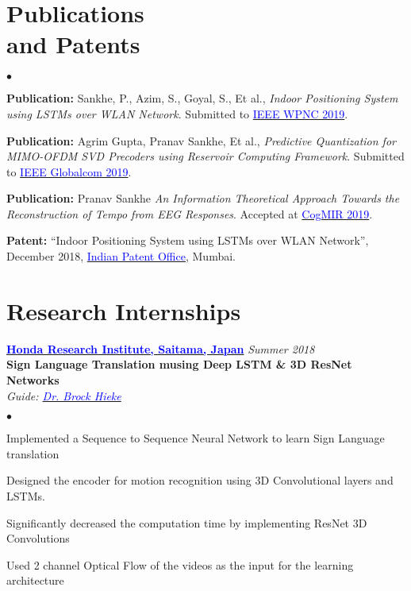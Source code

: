 \documentclass[margin,line]{res}
\newenvironment{list2}{
  \begin{list}{$\bullet$}{%
      \setlength{\itemsep}{0.03in}
      \setlength{\parsep}{0in} \setlength{\parskip}{0in}
      \setlength{\topsep}{0in} \setlength{\partopsep}{0in} 
      \setlength{\leftmargin}{0.2in}}}{\end{list}}
\begin{document}
\begin{resume}
\section{\sc Publications \\ and Patents}
\begin{list2}
\item \textbf{Publication:} Sankhe, P., Azim, S., Goyal, S., Et al., {\em Indoor Positioning System using LSTMs over WLAN Network}. Submitted to \href{https://wpnc.info}{\textcolor{blue}{IEEE WPNC 2019}}.

\item \textbf{Publication:} Agrim Gupta, Pranav Sankhe, Et al., {\em Predictive Quantization for MIMO-OFDM SVD Precoders using Reservoir Computing Framework}. Submitted to \href{https://globecom2019.ieee-globecom.org}{\textcolor{blue} {IEEE Globalcom 2019}}.

\item \textbf{Publication:} Pranav Sankhe {\em An Information Theoretical Approach Towards the Reconstruction of Tempo from EEG Responses}. Accepted at \href{http://www.cogmir.org}{\textcolor{blue} {CogMIR 2019}}.

\item \textbf{Patent:} “Indoor Positioning System using LSTMs over WLAN Network”, December 2018, \href{http://www.ipindia.nic.in}{\textcolor{blue} {Indian Patent Office}}, Mumbai.


\end{list2}

\section{\sc Research Internships}

{\bf  \href{http://www.jp.honda-ri.com/en/}{\textcolor{blue}{Honda Research Institute, Saitama, Japan}} } \hfill {\it Summer 2018} \\
\textbf{Sign Language Translation musing Deep LSTM \& 3D ResNet Networks} \\
{\em Guide: \href{https://www.researchgate.net/profile/Heike_Brock}{\textcolor{blue}{Dr. Brock Hieke}}}  \\
\vspace*{-.1in}
\begin{list2} \itemsep=-10pt
\item Implemented a Sequence to Sequence Neural Network to learn Sign Language translation \\ 
\item Designed the encoder for motion recognition using 3D Convolutional layers and LSTMs. \\ 
\item Significantly decreased the computation time by implementing ResNet 3D Convolutions\\ 
\item Used 2 channel Optical Flow of the videos as the input for the learning architecture \\ 
\end{list2}


\end{resume}
\end{document}
